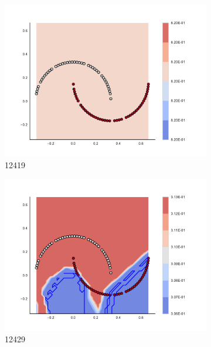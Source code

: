 \begin{figure}[h]
\begin{subfigure}[b]{0.09\textwidth}
    \includegraphics[clip, trim=2.35cm 1.75cm 4.5cm 0cm,width=\textwidth]{img/convergence/12419.pdf}
    \caption{12419}
    \label{fig:convergence_12419}
\end{subfigure}
%
\begin{subfigure}[b]{0.09\textwidth}
    \includegraphics[clip, trim=2.35cm 1.75cm 4.5cm 0cm,width=\textwidth]{img/convergence/12429.pdf}
    \caption{12429}
    \label{fig:convergence_12429}
\end{subfigure}
%
\begin{subfigure}[b]{0.09\textwidth}

\end{subfigure}
\end{figure}
